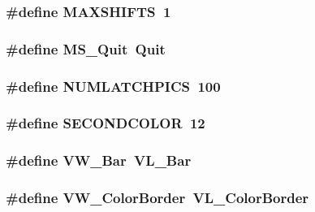 \label{ID__VH_8H_a20ac66827ff4d93b187d39a6d49b658c}
\hypertarget{ID__VH_8H_a61fc4b21f3668efb4e1a4cc2508bccab}{
\subsubsection[{MAXSHIFTS}]{\setlength{\rightskip}{0pt plus 5cm}\#define MAXSHIFTS~1}}
\label{ID__VH_8H_a61fc4b21f3668efb4e1a4cc2508bccab}
\hypertarget{ID__VH_8H_ad8efcae5e17b4673b60b3f2d46146405}{
\subsubsection[{MS\_\-Quit}]{\setlength{\rightskip}{0pt plus 5cm}\#define MS\_\-Quit~Quit}}
\label{ID__VH_8H_ad8efcae5e17b4673b60b3f2d46146405}
\hypertarget{ID__VH_8H_a58867ea52d9495b87bc4afa660b92e8a}{
\subsubsection[{NUMLATCHPICS}]{\setlength{\rightskip}{0pt plus 5cm}\#define NUMLATCHPICS~100}}
\label{ID__VH_8H_a58867ea52d9495b87bc4afa660b92e8a}
\hypertarget{ID__VH_8H_ae0a44e30cf324589e3ea42da1608d8b7}{
\subsubsection[{SECONDCOLOR}]{\setlength{\rightskip}{0pt plus 5cm}\#define SECONDCOLOR~12}}
\label{ID__VH_8H_ae0a44e30cf324589e3ea42da1608d8b7}
\hypertarget{ID__VH_8H_a924aa34c6a3cf4efe053305531a0e222}{
\subsubsection[{VW\_\-Bar}]{\setlength{\rightskip}{0pt plus 5cm}\#define VW\_\-Bar~VL\_\-Bar}}
\label{ID__VH_8H_a924aa34c6a3cf4efe053305531a0e222}
\hypertarget{ID__VH_8H_a6f21abd5ade208cc64f9286d26a34bbb}{
\subsubsection[{VW\_\-ColorBorder}]{\setlength{\rightskip}{0pt plus 5cm}\#define VW\_\-ColorBorder~VL\_\-ColorBorder}}
